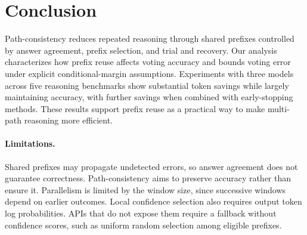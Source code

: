 \section{Conclusion}
Path-consistency reduces repeated reasoning through shared prefixes controlled by answer agreement, prefix selection, and trial and recovery. Our analysis characterizes how prefix reuse affects voting accuracy and bounds voting error under explicit conditional-margin assumptions. Experiments with three models across five reasoning benchmarks show substantial token savings while largely maintaining accuracy, with further savings when combined with early-stopping methods. These results support prefix reuse as a practical way to make multi-path reasoning more efficient.

\paragraph{Limitations.}
Shared prefixes may propagate undetected errors, so answer agreement does not guarantee correctness. Path-consistency aims to preserve accuracy rather than ensure it. Parallelism is limited by the window size, since successive windows depend on earlier outcomes. Local confidence selection also requires output token log probabilities. APIs that do not expose them require a fallback without confidence scores, such as uniform random selection among eligible prefixes.
